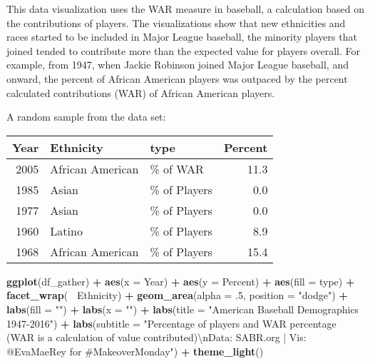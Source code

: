 \documentclass[]{book}
\newenvironment{Shaded}{\begin{snugshade}}{\end{snugshade}}
\newcommand{\KeywordTok}[1]{\textcolor[rgb]{0.13,0.29,0.53}{\textbf{#1}}}
\newcommand{\DataTypeTok}[1]{\textcolor[rgb]{0.13,0.29,0.53}{#1}}
\newcommand{\DecValTok}[1]{\textcolor[rgb]{0.00,0.00,0.81}{#1}}
\newcommand{\CharTok}[1]{\textcolor[rgb]{0.31,0.60,0.02}{#1}}
\newcommand{\StringTok}[1]{\textcolor[rgb]{0.31,0.60,0.02}{#1}}
\newcommand{\OperatorTok}[1]{\textcolor[rgb]{0.81,0.36,0.00}{\textbf{#1}}}
\newcommand{\NormalTok}[1]{#1}
\theoremstyle{definition}
\theoremstyle{definition}
\theoremstyle{definition}
\theoremstyle{remark}
\begin{document}
This data visualization uses the WAR measure in baseball, a calculation
based on the contributions of players. The visualizations show that new
ethnicities and races started to be included in Major League baseball,
the minority players that joined tended to contribute more than the
expected value for players overall. For example, from 1947, when Jackie
Robinson joined Major League baseball, and onward, the percent of
African American players was outpaced by the percent calculated
contributions (WAR) of African American players.

A random sample from the data set:

\begin{tabular}{r|l|l|r}
\hline
Year & Ethnicity & type & Percent\\
\hline
2005 & African American & \% of WAR & 11.3\\
\hline
1985 & Asian & \% of Players & 0.0\\
\hline
1977 & Asian & \% of Players & 0.0\\
\hline
1960 & Latino & \% of Players & 8.9\\
\hline
1968 & African American & \% of Players & 15.4\\
\hline
\end{tabular}

\begin{Shaded}
\begin{Highlighting}[]
\KeywordTok{ggplot}\NormalTok{(df_gather) }\OperatorTok{+}
\StringTok{  }\KeywordTok{aes}\NormalTok{(}\DataTypeTok{x =}\NormalTok{ Year) }\OperatorTok{+}
\StringTok{  }\KeywordTok{aes}\NormalTok{(}\DataTypeTok{y =}\NormalTok{ Percent) }\OperatorTok{+}
\StringTok{  }\KeywordTok{aes}\NormalTok{(}\DataTypeTok{fill =}\NormalTok{ type) }\OperatorTok{+}
\StringTok{  }\KeywordTok{facet_wrap}\NormalTok{(}\OperatorTok{~}\StringTok{ }\NormalTok{Ethnicity) }\OperatorTok{+}
\StringTok{  }\KeywordTok{geom_area}\NormalTok{(}\DataTypeTok{alpha =}\NormalTok{ .}\DecValTok{5}\NormalTok{, }\DataTypeTok{position =} \StringTok{"dodge"}\NormalTok{) }\OperatorTok{+}
\StringTok{  }\KeywordTok{labs}\NormalTok{(}\DataTypeTok{fill =} \StringTok{""}\NormalTok{) }\OperatorTok{+}
\StringTok{  }\KeywordTok{labs}\NormalTok{(}\DataTypeTok{x =} \StringTok{""}\NormalTok{) }\OperatorTok{+}
\StringTok{  }\KeywordTok{labs}\NormalTok{(}\DataTypeTok{title =} \StringTok{"American Baseball Demographics 1947-2016"}\NormalTok{) }\OperatorTok{+}
\StringTok{  }\KeywordTok{labs}\NormalTok{(}\DataTypeTok{subtitle =} \StringTok{"Percentage of players and WAR percentage (WAR is a calculation of value contributed)}\CharTok{\textbackslash{}n}\StringTok{Data: SABR.org | Vis: @EvaMaeRey for #MakeoverMonday"}\NormalTok{) }\OperatorTok{+}
\StringTok{  }\KeywordTok{theme_light}\NormalTok{() }
\end{Highlighting}
\end{Shaded}
\end{document}
